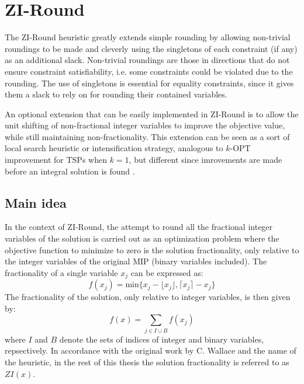 \documentclass[a4paper,12pt,twoside]{scrbook}
\begin{document}
\section{ZI-Round}
The ZI-Round heuristic greatly extends simple rounding by allowing non-trivial roundings to be made and cleverly using the singletons of each constraint (if any) as an additional slack. Non-trivial roundings are those in directions that do not ensure constraint satisfiability, i.e. some constraints could be violated due to the rounding. The use of singletons is essential for equality constraints, since it gives them a slack to rely on for rounding their contained variables. \par

An optional extension that can be easily implemented in ZI-Round is to allow the unit shifting of non-fractional integer variables to improve the objective value, while still maintaining non-fractionality. This extension can be seen as a sort of local search heuristic \cite{linker1973} or intensification strategy, analogous to $k$-OPT improvement for TSPs when $k = 1$, but different since imrovements are made before an integral solution is found \cite{wallace2010}. \par

\subsection{Main idea}
In the context of ZI-Round, the attempt to round all the fractional integer variables of the solution is carried out as an optimization problem where the objective function to minimize to zero is the solution fractionality, only relative to the integer variables of the original MIP (binary variables included). The fractionality of a single variable $x_j$ can be expressed as:
\begin{equation}
	f(x_j) = \text{min}\{x_j - \lfloor x_j \rfloor, \lceil x_j \rceil - x_j\}
\end{equation}
The fractionality of the solution, only relative to integer variables, is then given by:
\begin{equation}\label{eq:zi}
	f(x) = \sum_{j \in I \cup B}f(x_j)
\end{equation}
where $I$ and $B$ denote the sets of indices of integer and binary variables, repsectively.
In accordance with the original work by C. Wallace \cite{wallace2010} and the name of the heuristic, in the rest of this thesis the solution fractionality is referred to as $ZI(x)$. \par 
\end{document}
